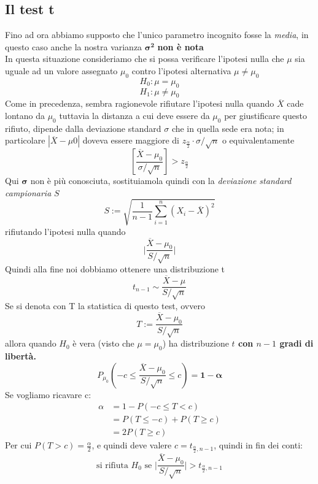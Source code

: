 \documentclass[]{article}
\begin{document}
    \subsection{Il test t}
    Fino ad ora abbiamo supposto che l'unico parametro incognito fosse la \textit{media}, in questo caso anche la nostra varianza $\boldsymbol{\sigma^2}$ \textbf{non è nota} \\
    In questa situazione consideriamo che si possa verificare l'ipotesi nulla che $\mu$ sia uguale ad un valore assegnato $\mu_0$ contro l'ipotesi alternativa $\mu \not= \mu_0$
    \[ H_0 : \mu = \mu_0 \]
    \[ H_1 : \mu \not= \mu_0 \]
    Come in precedenza, sembra ragionevole rifiutare l’ipotesi nulla quando $\overline{X}$ cade
    lontano da $\mu_0$ tuttavia la distanza a cui deve essere da $\mu_0$ per giustificare questo
    rifiuto, dipende dalla deviazione standard $\sigma$ che in quella sede era nota; in particolare
    $|\overline{X} - \mu0|$ doveva essere maggiore di $z_{\frac{\alpha}{2}} \cdot \sigma / \sqrt{n}$ o equivalentamente
    \[ \left[ \frac{\overline{X} - \mu_0}{\sigma / \sqrt{n}} \right] > z_{\frac{\alpha}{2}} \]
    Qui $\boldsymbol{\sigma}$ non è più conosciuta, sostituiamola quindi con la \textit{deviazione standard campionaria} $S$
    \[ S := \sqrt{\frac{1}{n-1} \sum_{i=1}^{n} (X_i - \overline{X})^2} \]
    rifiutando l'ipotesi nulla quando 
    \[ \big\rvert \frac{\overline{X} - \mu_0}{S / \sqrt{n}} \big\rvert \] 
    Quindi alla fine noi dobbiamo ottenere una distribuzione t
    \[  t_{n-1} \sim \frac{\overline{X} - \mu}{S/ \sqrt{n}} \]
    Se si denota con T la statistica di questo test, ovvero 
    \[ T := \frac{\overline{X} - \mu_0}{S / \sqrt{n}} \]
    allora quando $H_0$ è vera (visto che $\mu = \mu_0$) ha distribuzione \textbf{$t$ con $n-1$ gradi di libertà.}
    \[ P_{\mu_0} \left( - c \leq \frac{\overline{X} - \mu_0}{S / \sqrt{n}} \leq c \right) = \boldsymbol{1- \alpha} \]
    Se vogliamo ricavare c:
    \begin{equation*}
        \begin{split}
            \alpha &= 1 - P(-c \leq T < c) \\
            &= P(T \leq -c) + P(T \geq c) \\
            &= 2P(T \geq c)
        \end{split}
    \end{equation*}
    Per cui $P(T > c) = \frac{\alpha}{2}$, e quindi deve valere $c = t_{\frac{\alpha}{2}, n-1}$, quindi in fin dei conti:
    \[ \text{si rifiuta } H_0 \text{ se } \big| \frac{\overline{X} - \mu_0}{S / \sqrt{n}} \big| > t_{\frac{\alpha}{2}, n-1} \]
\end{document}
